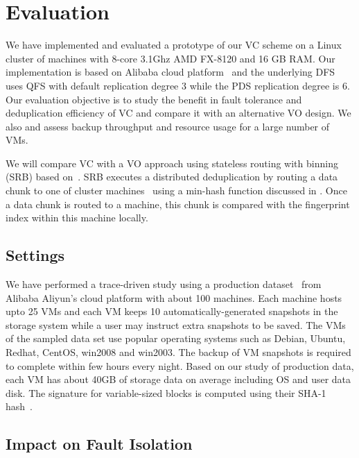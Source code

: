 \section{Evaluation}
\label{sect:evaluation}
We have implemented and evaluated a prototype of our VC scheme on a Linux cluster of machines with
8-core 3.1Ghz AMD FX-8120 and 16 GB RAM. 
Our implementation is based on Alibaba cloud platform~\cite{Aliyun,WeiZhangIEEE}
and the underlying DFS uses  QFS with default replication degree 3 while the PDS replication degree is 6.
Our evaluation objective is to
study the benefit in fault tolerance and   deduplication efficiency of VC and compare it
with an alternative VO design. We also and assess backup throughput and  resource usage for a large number of VMs.

We will compare VC with a VO approach  using stateless routing with binning (SRB) 
based on~\cite{Dong2011,extreme_binning09}.
SRB executes a distributed deduplication by routing a data chunk to one of cluster machines~\cite{Dong2011}
using  a min-hash function discussed in \cite{extreme_binning09}. Once a data chunk is routed to
a machine, this chunk is compared with the fingerprint index within this machine locally. 

\subsection{Settings}
We have performed a trace-driven study using a production dataset~\cite{WeiZhangIEEE} from 
Alibaba Aliyun's cloud platform with about 100 machines. 
Each machine hosts upto 25 VMs and each VM keeps 10 automatically-generated snapshots in the storage system while
a user may instruct extra snapshots to be saved.
The VMs of the sampled data set use popular operating systems such as 
Debian, Ubuntu, Redhat, CentOS, win2008 and win2003. 
The backup of VM snapshots is required to complete within few  hours every night.
Based on our study of production  data,  each VM has about 40GB of storage  data  on average
including OS and user data disk.
The signature for variable-sized blocks is computed using their SHA-1 hash~\cite{similar94,rabin81}. 

\subsection{Impact on Fault Isolation}


